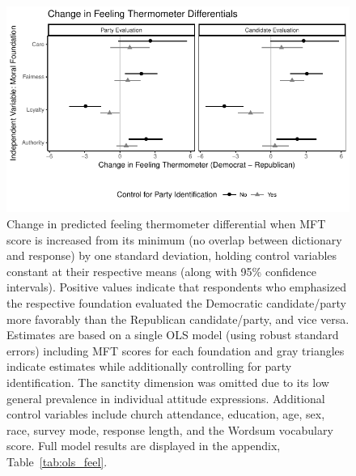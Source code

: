 \documentclass[12pt]{article}
\begin{document}
\begin{figure}[ht]\centering
\includegraphics{../calc/fig/ols_feel.pdf}
\caption{Change in predicted feeling thermometer differential when MFT score is increased from its minimum (no overlap between dictionary and response) by one standard deviation, holding control variables constant at their respective means (along with 95\% confidence intervals). Positive values indicate that respondents who emphasized the respective foundation evaluated the Democratic candidate/party more favorably than the Republican candidate/party, and vice versa. Estimates are based on a single OLS model (using robust standard errors) including MFT scores for each foundation and gray triangles indicate estimates while additionally controlling for party identification. The sanctity dimension was omitted due to its low general prevalence in individual attitude expressions. Additional control variables include church attendance, education, age, sex, race, survey mode, response length, and the Wordsum vocabulary score. Full model results are displayed in the appendix, Table~\ref{tab:ols_feel}.
}\label{fig:ols_feel}
\end{figure}
\end{document}
